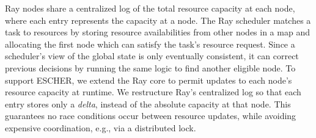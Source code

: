 Ray nodes share a centralized log of the total resource capacity at each node, where each entry represents the capacity at a node.
The Ray scheduler matches a task to resources by storing resource availabilities from other nodes in a map and allocating the first node which can satisfy the task's resource request.
Since a scheduler's view of the global state is only eventually consistent, it can correct previous decisions by running the same logic to find another eligible node. To support ESCHER, we extend the Ray core to permit updates to each node's resource capacity at runtime.
We restructure Ray's centralized log so that each entry stores only a \emph{delta}, instead of the absolute capacity at that node.
This guarantees no race conditions occur between resource updates, while avoiding expensive coordination, e.g., via a distributed lock.




